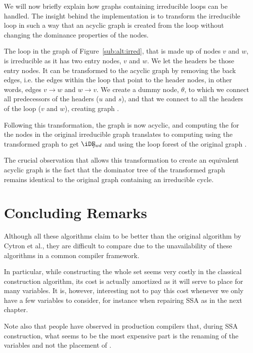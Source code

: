 {We will now briefly explain how graphs containing irreducible loops can be handled. 
The insight behind the implementation is to transform the irreducible loop in such a way that an acyclic graph is created from the loop without changing the dominance properties of the nodes.

The loop in the graph of Figure~\ref{sub:alt:irred}, that is made up of nodes $v$ and $w$, is irreducible as it has two entry nodes, $v$ and $w$. 
We let the headers be those entry nodes. 
It can be transformed to the acyclic graph  by removing the back edges, i.e.  the edges within the loop that point to the header nodes, in other words, edges $v\rightarrow w$ and $w\rightarrow v$. 
We create a dummy node, $\theta$, to which we connect all predecessors of the headers ($u$ and $s$), and that we connect to all the headers of the loop ($v$ and $w$), creating graph .

Following this transformation, the graph is now acyclic, and computing the \iDF for the nodes in the original irreducible graph translates to computing \iDF using the transformed graph to get $\iDFfwd$ and using the loop forest of the original graph .

The crucial observation that allows this transformation to create an equivalent acyclic graph is the fact that the dominator tree of the transformed graph remains identical to the original graph containing an irreducible cycle.

\section{Concluding Remarks}

Although all these algorithms claim to be better than the original algorithm by Cytron et al., they are difficult to compare due to the unavailability of these algorithms in a common compiler framework.

In particular, while constructing the whole \iDF set seems very costly in the classical construction algorithm, its cost is actually amortized as it will serve to place \phifuns for many variables. 
It is, however, interesting not to pay this cost whenever we only have a few variables to consider, for instance when repairing SSA as in the next chapter.

Note also that people have observed in production compilers that, during SSA construction, what seems to be the most expensive part is the renaming of the variables and not the placement of \phifuns.



}

